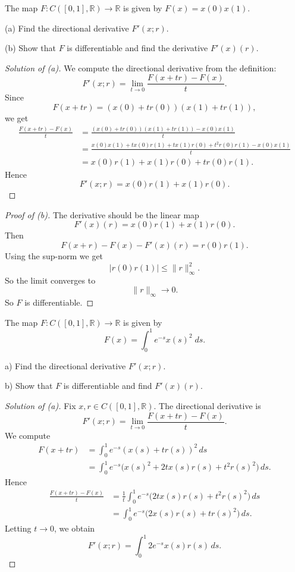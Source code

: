 \begin{prob}
    The map $F : C([0,1], \mathbb R) \to \mathbb R$ is given by 
    $F(x) = x(0)x(1)$. 

    (a) Find the directional derivative $F'(x;r)$. 

    (b) Show that $F$ is differentiable and find the derivative 
    $F'(x)(r)$.
\end{prob}
\begin{proof}[Solution of (a)]
    We compute the directional derivative from the definition:
    \[
        F'(x;r)=\lim_{t\to 0}\frac{F(x+tr)-F(x)}{t}.
    \]
    Since
    \[
        F(x+tr)=(x(0)+tr(0))(x(1)+tr(1)),
    \]
    we get
    \begin{align*}
        \frac{F(x+tr)-F(x)}{t}
&= \frac{(x(0)+tr(0))(x(1)+tr(1)) - x(0)x(1)}{t} \\
&= \frac{x(0)x(1)+t x(0)r(1)+t x(1)r(0)+t^2 r(0)r(1)-x(0)x(1)}{t} \\
&= x(0)r(1)+x(1)r(0)+t r(0)r(1).
    \end{align*}
    Hence
    \[
        F'(x;r)=x(0)r(1)+x(1)r(0).
    \]
\end{proof}
\begin{proof}[Proof of (b)]
    The derivative should be the linear map 
    \[
        F'(x)(r) = x(0)r(1) + x(1)r(0).
    \]
    Then 
    \[
        F(x+r) - F(x) - F'(x)(r) = r(0)r(1).
    \]
    Using the sup-norm we get 
    \[
        |r(0)r(1)| \leq \|r\|_\infty^2.
    \]
    So the limit converges to 
    \[
        \|r\|_\infty \to 0.
    \]
    So $F$ is differentiable.
\end{proof}
\begin{prob}
    The map $F : C([0,1], \mathbb R) \to \mathbb R$ is given by 
    \[
        F(x) = \int_0^1 e^{-s}x(s)^2 \; ds.
    \]

    a) Find the directional derivative $F'(x;r)$. 

    b) Show that $F$ is differentiable and find $F'(x)(r)$.
\end{prob}
\begin{proof}[Solution of (a)]
    Fix $x, r \in C([0,1], \mathbb R)$. The directional derivative is
    \[
        F'(x;r) = \lim_{t \to 0} \frac{F(x+tr) - F(x)}{t}.
    \]
    We compute
    \begin{align*}
        F(x+tr)
        &= \int_0^1 e^{-s}(x(s) + t r(s))^2 \, ds \\
        &= \int_0^1 e^{-s}\big(x(s)^2 + 2t x(s)r(s) + t^2 r(s)^2\big)\, ds.
    \end{align*}
    Hence
    \begin{align*}
        \frac{F(x+tr) - F(x)}{t}
        &= \frac{1}{t} \int_0^1 e^{-s}\big(2t x(s)r(s) + t^2 r(s)^2\big)\, ds \\
        &= \int_0^1 e^{-s}\big(2x(s)r(s) + t r(s)^2\big)\, ds.
    \end{align*}
    Letting $t \to 0$, we obtain
    \[
        F'(x;r) = \int_0^1 2e^{-s}x(s)r(s)\, ds.
    \]
\end{proof}

